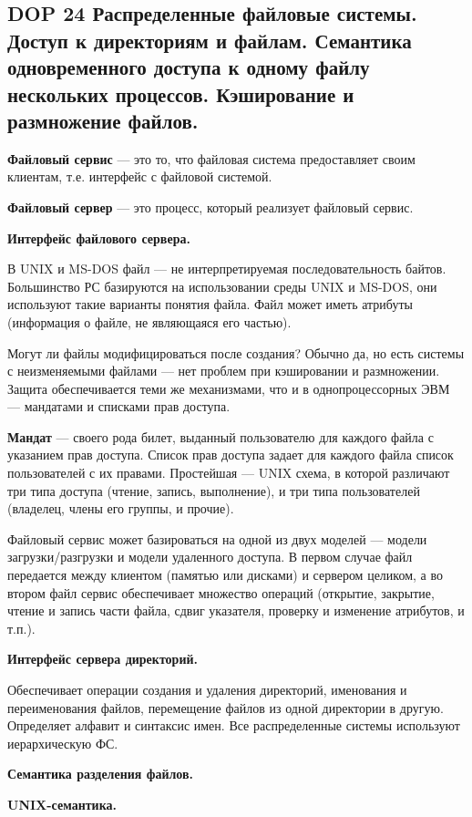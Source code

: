 \subsection{DOP 24 Распределенные файловые системы. Доступ к директориям и файлам. Семантика одновременного доступа к одному файлу нескольких процессов. Кэширование и размножение файлов.}

\textbf{Файловый сервис} --- это то, что файловая система предоставляет своим клиентам, т.е. интерфейс с файловой системой.

\textbf{Файловый сервер} --- это процесс, который реализует файловый сервис.

\textbf{Интерфейс файлового сервера.}

В UNIX и MS-DOS файл --- не интерпретируемая последовательность байтов.
Большинство РС базируются на использовании среды UNIX и MS-DOS, они используют такие варианты понятия файла.
Файл может иметь атрибуты (информация о файле, не являющаяся его частью).

Могут ли файлы модифицироваться после создания? Обычно да, но есть системы с неизменяемыми файлами --- нет проблем при кэшировании и размножении.
Защита обеспечивается теми же механизмами, что и в однопроцессорных ЭВМ --- мандатами и списками прав доступа.

\textbf{Мандат} --- своего рода билет, выданный пользователю для каждого файла с указанием прав доступа.
Список прав доступа задает для каждого файла список пользователей с их правами.
Простейшая --- UNIX схема, в которой различают три типа доступа (чтение, запись, выполнение), и три типа пользователей (владелец, члены его группы, и прочие).

Файловый сервис может базироваться на одной из двух моделей --- модели загрузки/разгрузки и модели удаленного доступа.
В первом случае файл передается между клиентом (памятью или дисками) и сервером целиком, а во втором файл сервис обеспечивает множество операций (открытие, закрытие, чтение и запись части файла, сдвиг указателя, проверку и изменение атрибутов, и т.п.).

\textbf{Интерфейс сервера директорий.}

Обеспечивает операции создания и удаления директорий, именования и переименования файлов, перемещение файлов из одной директории в другую.
Определяет алфавит и синтаксис имен.
Все распределенные системы используют иерархическую ФС.

\textbf{Семантика разделения файлов.}

\textbf{UNIX-семантика.}

